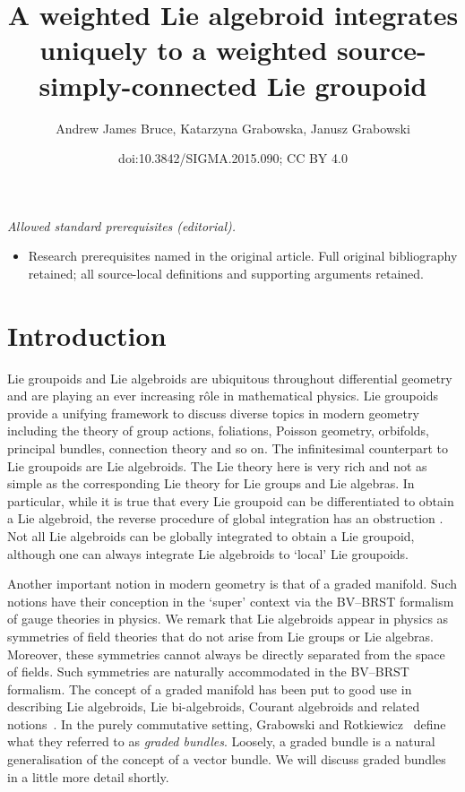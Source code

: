 \documentclass[10pt,a4paper]{amsart}
\title{A weighted Lie algebroid integrates uniquely to a weighted source-simply-connected Lie groupoid}
\author{Andrew James Bruce, Katarzyna Grabowska, Janusz Grabowski}
\date{doi:10.3842/SIGMA.2015.090; CC BY 4.0}
\numberwithin{equation}{section}
\begin{document}
\maketitle
\noindent\textit{Allowed standard prerequisites (editorial).}\begin{itemize}
\item Research prerequisites named in the original article. Full original bibliography retained; all source-local definitions and supporting arguments retained.
\end{itemize}\medskip
\section{Introduction}\label{sec:Intro}
Lie groupoids and Lie algebroids are ubiquitous throughout dif\/ferential geometry and are playing an ever increasing r\^{o}le in mathematical physics.  Lie groupoids provide a unifying framework to discuss diverse topics in modern geometry including the theory of group actions, foliations, Poisson geometry, orbifolds, principal bundles, connection theory  and so on.  The inf\/initesimal counterpart to Lie groupoids are  Lie algebroids. The Lie theory here is very rich and not as simple as the corresponding Lie theory for   Lie groups and Lie algebras. In particular, while it is true  that  every Lie groupoid  can be dif\/ferentiated to obtain a Lie algebroid, the reverse procedure of  global integration has an obstruction \cite{Crainic:2003,Mackenzie:1987}. Not all Lie algebroids can be globally  integrated to obtain a Lie groupoid,  although one can always integrate Lie algebroids to `local' Lie groupoids.

Another important notion in modern geometry is that of a graded manifold. Such notions  have their conception in the `super' context via the BV--BRST formalism of gauge theories in physics. We remark that Lie algebroids appear in physics as symmetries of f\/ield theories that do not arise from Lie groups or Lie algebras. Moreover, these symmetries cannot always be directly separated from the space of f\/ields. Such symmetries are naturally accommodated in the  BV--BRST formalism. The concept of  a graded manifold has  been put to good use in describing Lie algebroids, Lie bi-algebroids, Courant algebroids and related notions~\cite{Roytenberg:2001,Roytenberg:2006,Voronov:2001qf,Voronov:2012}.    In the purely commutative setting, Grabowski and Rotkiewicz~\cite{Grabowski2012} def\/ine what they referred to as \emph{graded bundles}. Loosely, a graded bundle is a natural generalisation of the concept of a vector bundle. We will discuss graded bundles in a little more detail shortly.
\end{document}
